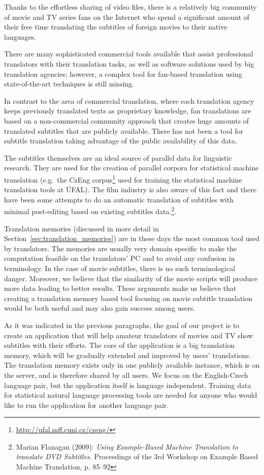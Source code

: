 Thanks to the effortless sharing of video files, there is a relatively big community of movie and TV series fans on the Internet who spend a significant amount of their free time translating the subtitles of foreign movies to their native languages.


There are many sophisticated commercial tools available that assist professional translators with their translation tasks, as well as software solutions used by big translation agencies; however, a complex tool for fan-based translation using  state-of-the-art techniques is still missing.

In contrast to the area of commercial translation, where each translation agency keeps previously translated texts as proprietary knowledge, fan translations are based on a non-commercial community approach that creates huge amounts of translated subtitles that are publicly available. There has not been a tool for subtitle translation taking advantage of the public availability of this data.

The subtitles themselves are an ideal source of parallel data for linguistic research. They are used for the creation of  parallel corpora for statistical machine translation (e.g.\ the CzEng corpus\footnote{\url{http://ufal.mff.cuni.cz/czeng/}} used for training the statistical machine translation tools at ÚFAL). The film industry is also aware of this fact and there have been some attempts to do an automatic translation of  subtitles  with minimal post-editing based on existing subtitles data.\footnote{Marian Flanagan (2009): \emph{Using Example-Based Machine Translation to translate DVD Subtitles.} Proceedings of the 3rd Workshop on Example Based Machine Translation, p. 85–92}.

Translation memories (discussed in more detail in Section~\ref{sec:translation_memories}) are in these days the most common tool used by translators. The memories are usually very domain specific to make the computation feasible on the translators' PC and to avoid any confusion in terminology. In the case of movie subtitles, there is no such terminological danger. Moreover, we believe that the similarity of the movie scripts will produce more data leading to better results. These arguments make us believe that creating a translation memory based tool focusing on movie subtitle translation would be both useful and may also gain success among users.

As it was indicated in the previous paragraphs, the goal of our project is to create an application that will help amateur translators of movies and TV show subtitles with their efforts. The core of the application is a big translation memory, which will be gradually extended and improved by users' translations. The translation memory exists only in one publicly available instance, which is on the server, and is therefore shared by all users. We focus on the English-Czech language pair, but the application itself is language independent. Training data for statistical natural language processing tools are needed for anyone who would like to run the application for another language pair.

